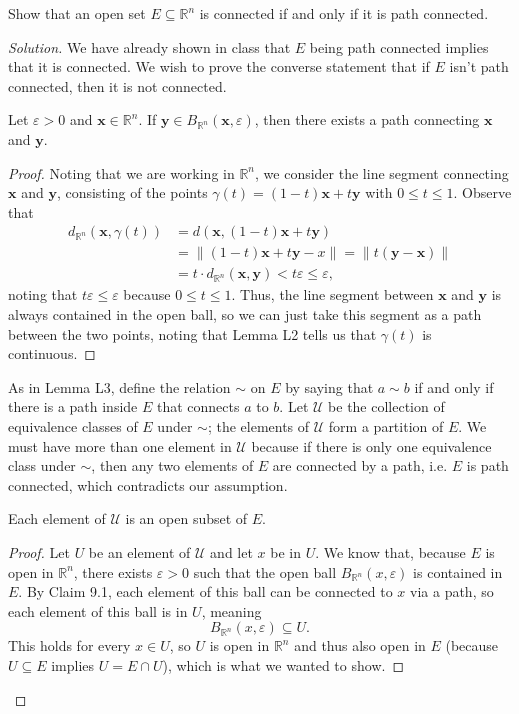 \documentclass[11pt]{scrartcl}
\providecommand{\eps}{\varepsilon}
\providecommand{\RR}{\mathbb R}
\providecommand{\mb}[1]{\mathbf{#1}}
\newenvironment{soln}{\begin{proof}[Solution]}{\end{proof}}
\begin{document}
\begin{problem}
	Show that an open set $E\subseteq \RR^n$ is connected
	if and only if it is path connected.
\end{problem}

\begin{soln}
	We have already shown in class that $E$ being path connected
	implies that it is connected.
	We wish to prove the converse statement that
	if $E$ isn't path connected, then it is not connected.

	\begin{claim}
		Let $\eps > 0$ and $\mb x\in\RR^n$.
		If $\mb y \in B_{\RR^n}(\mb x, \eps)$,
		then there exists a path connecting $\mb x$ and $\mb y$.
	\end{claim}
	\begin{proof}
		Noting that we are working in $\RR^n$,
		we consider the line segment connecting $\mb x$ and $\mb y$,
		consisting of the points
		$\gamma(t) = (1-t)\mb x+t\mb y$ with $0\le t\le 1$.
		Observe that
		\begin{align*}
			d_{\RR^n}(\mb x,\gamma(t)) &= d(\mb x, (1-t)\mb x + t\mb y)\\
			&= \|(1 - t)\mb x +t\mb y - x\| = \|t(\mb y - \mb x)\|\\
			&= t\cdot d_{\RR^n}(\mb x,\mb y) < t\eps \le \eps,
		\end{align*}
		noting that $t\eps \le \eps$ because $0\le t\le1$.
		Thus, the line segment between $\mb x$ and $\mb y$
		is always contained in the open ball,
		so we can just take this segment as a path between the two points,
		noting that Lemma L2 tells us that $\gamma(t)$ is continuous.
	\end{proof}
	
	As in Lemma L3, define the relation $\sim$ on $E$ by saying that
	$a\sim b$ if and only if there is a path inside $E$
	that connects $a$ to $b$.
	Let $\mathcal U$ be the collection of
	equivalence classes of $E$ under $\sim$;
	the elements of $\mathcal U$ form a partition of $E$.
	We must have more than one element in $\mathcal U$
	because if there is only one equivalence class under $\sim$,
	then any two elements of $E$ are connected by a path,
	i.e. $E$ is path connected, which contradicts our assumption.
	
	\begin{claim}
		Each element of $\mathcal U$ is an open subset of $E$.
	\end{claim}
	\begin{proof}
		Let $U$ be an element of $\mathcal U$ and let $x$ be in $U$.
		We know that, because $E$ is open in $\RR^n$,
		there exists $\eps > 0$ such that
		the open ball $B_{\RR^n}(x, \eps)$ is contained in $E$.
		By Claim 9.1, each element of this ball
		can be connected to $x$ via a path,
		so each element of this ball is in $U$, meaning
		\[B_{\RR^n}(x, \eps) \subseteq U.\]
		This holds for every $x\in U$, so $U$ is open in $\RR^n$
		and thus also open in $E$
		(because $U\subseteq E$ implies $U = E\cap U$),
		which is what we wanted to show.
	\end{proof}


\end{soln}
\end{document}
